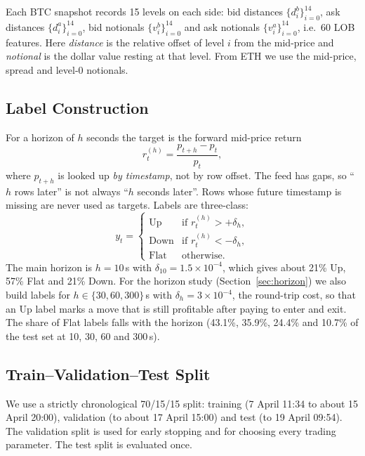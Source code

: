 Each BTC snapshot records 15 levels on each side: bid distances $\{d^b_i\}_{i=0}^{14}$,
ask distances $\{d^a_i\}_{i=0}^{14}$, bid notionals $\{v^b_i\}_{i=0}^{14}$ and ask notionals
$\{v^a_i\}_{i=0}^{14}$, i.e.\ 60 LOB features. Here \emph{distance} is the relative offset of
level $i$ from the mid-price and \emph{notional} is the dollar value resting at that level.
From ETH we use the mid-price, spread and level-0 notionals.

\subsection{Label Construction}
For a horizon of $h$ seconds the target is the forward mid-price return
\begin{equation}
  r^{(h)}_t = \frac{p_{t+h} - p_t}{p_t},
  \label{eq:fwdret}
\end{equation}
where $p_{t+h}$ is looked up \emph{by timestamp}, not by row offset. The feed has gaps, so
``$h$ rows later'' is not always ``$h$ seconds later''. Rows whose future timestamp is
missing are never used as targets. Labels are three-class:
\begin{equation}
  y_t =
  \begin{cases}
    \text{Up}   & \text{if } r^{(h)}_t > +\delta_h,\\
    \text{Down} & \text{if } r^{(h)}_t < -\delta_h,\\
    \text{Flat} & \text{otherwise.}
  \end{cases}
  \label{eq:label}
\end{equation}
The main horizon is $h=10$\,s with $\delta_{10} = 1.5\times10^{-4}$, which gives about
21\% Up, 57\% Flat and 21\% Down. For the horizon study (Section~\ref{sec:horizon}) we also
build labels for $h \in \{30, 60, 300\}$\,s with $\delta_h = 3\times10^{-4}$, the round-trip
cost, so that an Up label marks a move that is still profitable after paying to enter and
exit. The share of Flat labels falls with the horizon (43.1\%, 35.9\%, 24.4\% and 10.7\% of
the test set at 10, 30, 60 and 300\,s).

\subsection{Train--Validation--Test Split}
\label{sec:split}
We use a strictly chronological 70/15/15 split: training (7 April 11:34 to about
15 April 20:00), validation (to about 17 April 15:00) and test (to 19 April 09:54). The
validation split is used for early stopping and for choosing every trading parameter.
The test split is evaluated once.

